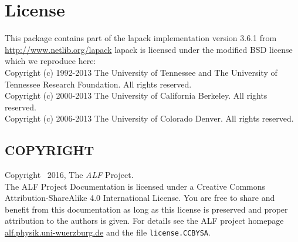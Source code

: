 
\section*{License}




This package contains part of the lapack implementation version 3.6.1 from \url{http://www.netlib.org/lapack}
lapack is licensed under the modified BSD license which we reproduce here:\\

Copyright (c) 1992-2013 The University of Tennessee and The University
                        of Tennessee Research Foundation.  All rights
                        reserved.\\
Copyright (c) 2000-2013 The University of California Berkeley. All
                        rights reserved.\\
Copyright (c) 2006-2013 The University of Colorado Denver.  All rights
                        reserved.
                        
\subsection*{COPYRIGHT}

Copyright \textcopyright ~2016, The \textit{ALF} Project.\\
The ALF Project Documentation 
is licensed under a Creative Commons Attribution-ShareAlike 4.0 International License.
You are free to share and benefit from this documentation as long as this license is preserved
and proper attribution to the authors is given. For details see the ALF project
homepage \url{alf.physik.uni-wuerzburg.de} and the file \texttt{license.CCBYSA}.
